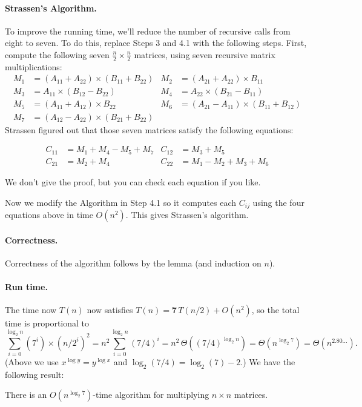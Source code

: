 \paragraph{Strassen's Algorithm.}
To improve the running time, we'll reduce the number of recursive calls
from eight to seven.
To do this, replace Steps 3 and 4.1 with the following steps.
First, compute the following seven $\frac{n}{2} \times \frac{n}{2}$ matrices,
using seven recursive matrix multiplications:
\begin{align*}
  {M}_{1} & = ({A}_{11} + {A}_{22}) \times ({B}_{11} + {B}_{22})
            & {M}_{2} & = ({A}_{21} + {A}_{22}) \times {B}_{11} \\
  {M}_{3} & = {A}_{11} \times ({B}_{12} - {B}_{22}) 
            & {M}_{4} & = {A}_{22} \times ({B}_{21} - {B}_{11}) \\
  {M}_{5} & = ({A}_{11} + {A}_{12}) \times {B}_{22} 
            & {M}_{6} & = ({A}_{21} - {A}_{11}) \times  ({B}_{11} + {B}_{12}) \\
  {M}_{7} & = ({A}_{12} - {A}_{22}) \times ({B}_{21} + {B}_{22})
\end{align*}  
Strassen figured out that those seven matrices satisfy the following equations:
\begin{lemma}[Strassen]
  \begin{align*}
    {C}_{11} & = {M}_{1} + {M}_{4} - {M}_{5} + {M}_{7}
    & {C}_{12} & = {M}_{3} + {M}_{5} \\
    {C}_{21} & = {M}_{2} + {M}_{4}
    & {C}_{22} & = {M}_{1} - {M}_{2} + {M}_{3} + {M}_{6}
  \end{align*}
\end{lemma}
We don't give the proof, but you can check each equation if you like.

Now we modify the Algorithm in Step 4.1 so it computes each $C_{ij}$ using the four equations above
in time $O(n^2)$.  This gives Strassen's algorithm.

\paragraph{Correctness.}
Correctness of the algorithm follows by the lemma (and induction on $n$).

\paragraph{Run time.}
The time now $T(n)$ now satisfies
$T(n) = \mathbf{7}\,T(n/2) + O(n^2)$,
so the total time is proportional to
\[
  \sum_{i=0}^{\log_2 n} (7^i)\times (n/2^i)^2 
    = n^2 \sum_{i=0}^{\log_2 n} (7/4)^i
  = n^2\, \Theta((7/4)^{\log_2 n})
  = \Theta(n^{\log_2 7}) = \Theta(n^{2.80\ldots}).
\]
(Above we use $x^{\log y} = y^{\log x}$ and $\log_2 (7/4) = \log_2(7) - 2$.)
We have the following result:
\begin{theorem}[Strassen]
  There is an $O(n^{\log_2 7})$-time algorithm
  for multiplying $n\times n$ matrices.
\end{theorem}

